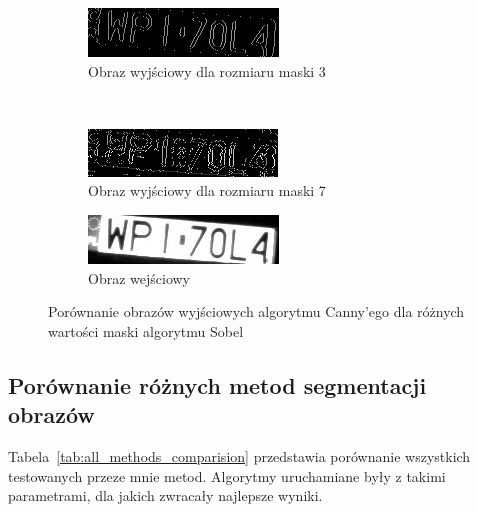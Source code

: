 \begin{figure}
  \centering
  \begin{subfigure}[b]{0.45\textwidth}
    \includegraphics[width=\textwidth]{img/results-canny-ok-sobel}
    \caption{Obraz wyjściowy dla rozmiaru maski 3}
    \label{fig:results_canny_ok_sobel}
  \end{subfigure}
  ~
  \begin{subfigure}[b]{0.45\textwidth}
    \includegraphics[width=\textwidth]{img/results-canny-bad-sobel}
    \caption{Obraz wyjściowy dla rozmiaru maski 7}
    \label{fig:results_canny_bad_sobel}
  \end{subfigure}
\begin{subfigure}[b]{0.45\textwidth}
    \includegraphics[width=\textwidth]{img/results-canny-input-sobel}
    \caption{Obraz wejściowy}
    \label{fig:results_canny_input_sobel}
  \end{subfigure}

  \caption{Porównanie obrazów wyjściowych algorytmu Canny'ego dla różnych wartości maski algorytmu Sobel}
  \label{fig:results_canny_sobel_compare}
\end{figure}


\subsection{Porównanie różnych metod segmentacji obrazów}
Tabela~\ref{tab:all_methods_comparision} przedstawia porównanie wszystkich testowanych przeze mnie metod. Algorytmy uruchamiane były z takimi parametrami, dla jakich zwracały najlepsze wyniki.

